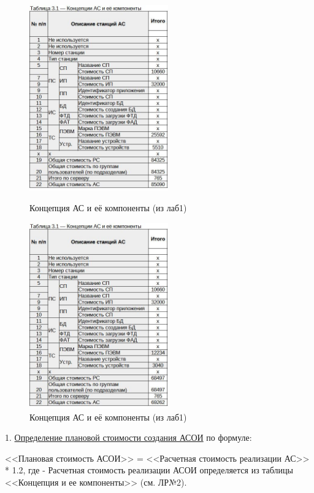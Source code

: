 \documentclass[12pt, a4paper, simple]{eskdtext}
\begin{document}
    \begin{figure}[!hp]
        \begin{minipage}{0.48\textwidth}
            \centering
            \includegraphics[height=8cm]
            {_docs/Таблица3-1КонцепцияАСИЕеКомпоненты.jpg}
            \caption{Концепция АС и её компоненты (из лаб1)}
        \end{minipage}
        \begin{minipage}{0.48\textwidth}
            \centering
            \includegraphics[height=8cm]
            {_docs/Таблица3-1КонцепцияАСИЕеКомпоненты__лаб2.jpg}
            \caption{Концепция АС и её компоненты (из лаб1)}
        \end{minipage}
     \end{figure}

    1. \underline{Определение плановой стоимости создания АСОИ} по формуле:
    
    <<Плановая стоимость АСОИ>> = <<Расчетная стоимость реализации АС>> * 1.2,
    где - Расчетная стоимость реализации АСОИ определяется из таблицы <<Концепция и ее компоненты>> (см. ЛР№2).
    
\end{document}

